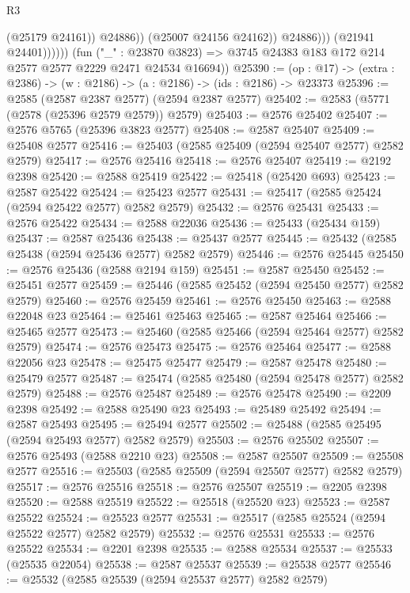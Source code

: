 \begin{lexlean}{R3}
\begin{coremodule}
                              (@25179 @24161))
                            @24886))
                        (@25007 @24156 @24162))
                      @24886)))
                (@21941 @24401))))))
      (fun ("_" : @23870 @3823) =>
      @3745 @24383 @183 @172 @214 @2577 @2577 @2229 @2471 @24534 @16694))
@25390 := (op : @17) -> (extra : @2386) -> (w : @2186) -> (a : @2186) -> (ids : @2186) -> @23373
@25396 := @2585 (@2587 @2387 @2577) (@2594 @2387 @2577)
@25402 := @2583 (@5771 (@2578 (@25396 @2579 @2579)) @2579)
@25403 := @2576 @25402
@25407 := @2576 @5765 (@25396 @3823 @2577)
@25408 := @2587 @25407
@25409 := @25408 @2577
@25416 := @25403 (@2585 @25409 (@2594 @25407 @2577) @2582 @2579)
@25417 := @2576 @25416
@25418 := @2576 @25407
@25419 := @2192 @2398
@25420 := @2588 @25419
@25422 := @25418 (@25420 @693)
@25423 := @2587 @25422
@25424 := @25423 @2577
@25431 := @25417 (@2585 @25424 (@2594 @25422 @2577) @2582 @2579)
@25432 := @2576 @25431
@25433 := @2576 @25422
@25434 := @2588 @22036
@25436 := @25433 (@25434 @159)
@25437 := @2587 @25436
@25438 := @25437 @2577
@25445 := @25432 (@2585 @25438 (@2594 @25436 @2577) @2582 @2579)
@25446 := @2576 @25445
@25450 := @2576 @25436 (@2588 @2194 @159)
@25451 := @2587 @25450
@25452 := @25451 @2577
@25459 := @25446 (@2585 @25452 (@2594 @25450 @2577) @2582 @2579)
@25460 := @2576 @25459
@25461 := @2576 @25450
@25463 := @2588 @22048 @23
@25464 := @25461 @25463
@25465 := @2587 @25464
@25466 := @25465 @2577
@25473 := @25460 (@2585 @25466 (@2594 @25464 @2577) @2582 @2579)
@25474 := @2576 @25473
@25475 := @2576 @25464
@25477 := @2588 @22056 @23
@25478 := @25475 @25477
@25479 := @2587 @25478
@25480 := @25479 @2577
@25487 := @25474 (@2585 @25480 (@2594 @25478 @2577) @2582 @2579)
@25488 := @2576 @25487
@25489 := @2576 @25478
@25490 := @2209 @2398
@25492 := @2588 @25490 @23
@25493 := @25489 @25492
@25494 := @2587 @25493
@25495 := @25494 @2577
@25502 := @25488 (@2585 @25495 (@2594 @25493 @2577) @2582 @2579)
@25503 := @2576 @25502
@25507 := @2576 @25493 (@2588 @2210 @23)
@25508 := @2587 @25507
@25509 := @25508 @2577
@25516 := @25503 (@2585 @25509 (@2594 @25507 @2577) @2582 @2579)
@25517 := @2576 @25516
@25518 := @2576 @25507
@25519 := @2205 @2398
@25520 := @2588 @25519
@25522 := @25518 (@25520 @23)
@25523 := @2587 @25522
@25524 := @25523 @2577
@25531 := @25517 (@2585 @25524 (@2594 @25522 @2577) @2582 @2579)
@25532 := @2576 @25531
@25533 := @2576 @25522
@25534 := @2201 @2398
@25535 := @2588 @25534
@25537 := @25533 (@25535 @22054)
@25538 := @2587 @25537
@25539 := @25538 @2577
@25546 := @25532 (@2585 @25539 (@2594 @25537 @2577) @2582 @2579)

\end{coremodule}
\end{lexlean}
